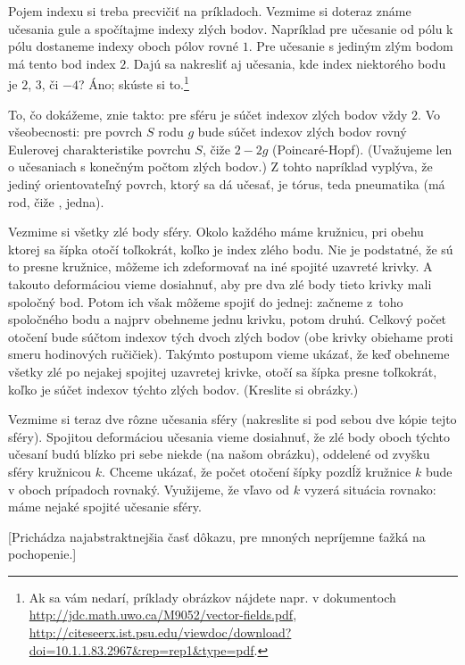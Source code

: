 \documentclass[a4paper]{article}
\begin{document}
Pojem indexu si treba precvičiť na príkladoch. Vezmime si doteraz známe učesania gule a spočítajme indexy zlých bodov. Napríklad pre učesanie od pólu k pólu dostaneme indexy oboch pólov rovné $1$. Pre učesanie s jediným zlým bodom má tento bod index $2$. Dajú sa nakresliť aj učesania, kde index niektorého bodu je $2$, $3$, či $-4$? Áno; skúste si to.\footnote{Ak sa vám nedarí, príklady obrázkov nájdete napr. v dokumentoch\hfil\break
\url{http://jdc.math.uwo.ca/M9052/vector-fields.pdf},\hfil\break
\url{http://citeseerx.ist.psu.edu/viewdoc/download?doi=10.1.1.83.2967&rep=rep1&type=pdf}.}

To, čo dokážeme, znie takto: pre sféru je súčet indexov zlých bodov vždy $2$. Vo všeobecnosti: pre povrch $S$ rodu $g$ bude súčet indexov zlých bodov rovný Eulerovej charakteristike povrchu $S$, čiže $2-2g$ (Poincaré-Hopf). (Uvažujeme len o učesaniach s konečným počtom zlých bodov.) Z tohto napríklad vyplýva, že jediný orientovateľný povrch, ktorý sa dá učesať, je tórus, teda pneumatika (má rod, čiže , jedna).

Vezmime si všetky zlé body sféry. Okolo každého máme kružnicu, pri obehu ktorej sa šípka otočí toľkokrát, koľko je index zlého bodu. Nie je podstatné, že sú to presne kružnice, môžeme ich zdeformovať na iné spojité uzavreté krivky. A takouto deformáciou vieme dosiahnuť, aby pre dva zlé body tieto krivky mali spoločný bod. Potom ich však môžeme spojiť do jednej: začneme z~toho spoločného bodu a najprv obehneme jednu krivku, potom druhú. Celkový počet otočení bude súčtom indexov tých dvoch zlých bodov (obe krivky obiehame proti smeru hodinových ručičiek). Takýmto postupom vieme ukázať, že keď obehneme všetky zlé po nejakej spojitej uzavretej krivke, otočí sa šípka presne toľkokrát, koľko je súčet indexov týchto zlých bodov. (Kreslite si obrázky.)

Vezmime si teraz dve rôzne učesania sféry (nakreslite si pod sebou dve kópie tejto sféry). Spojitou deformáciou učesania vieme dosiahnuť, že zlé body oboch týchto učesaní budú blízko pri sebe niekde  (na našom obrázku), oddelené od zvyšku sféry kružnicou $k$. Chceme ukázať, že počet otočení šípky pozdĺž kružnice $k$ bude v oboch prípadoch rovnaký. Využijeme, že vľavo od $k$ vyzerá situácia rovnako: máme nejaké spojité učesanie sféry.

[Prichádza najabstraktnejšia časť dôkazu, pre mnoných nepríjemne ťažká na pochopenie.]

\let\phi = \varphi
\end{document}
